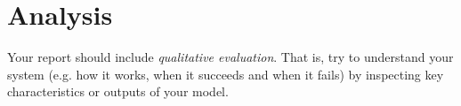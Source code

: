 \section{Analysis}
Your report should include \textit{qualitative evaluation}. That is, try to understand your system (e.g. how it works, when it succeeds and when it fails) by inspecting key characteristics or outputs of your model.
